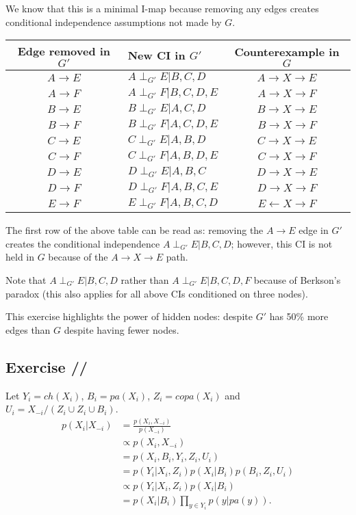 \documentclass[a4paper,11pt]{article}
\newcounter{exercise}
\newcounter{subexercise}
\newcommand*{\exercise}[1][]{\subsection*{Exercise \ifx/#1/\stepcounter{exercise}\arabic{exercise}\else#1\fi}\setcounter{subexercise}{0}}
\begin{document}
We know that this is a minimal I-map because removing any edges creates conditional
independence assumptions not made by $G$.
\begin{center}
    \begin{tabular}{ c|l|c } 
        Edge removed in $G'$ & New CI in $G'$ & Counterexample in $G$\\
         \hline
         $A\rightarrow E$ & $A\perp_{G'}E|B,C,D$ & $A\rightarrow X\rightarrow E$ \\
         $A\rightarrow F$ & $A\perp_{G'}F|B,C,D,E$ & $A\rightarrow X\rightarrow F$ \\
         $B\rightarrow E$ & $B\perp_{G'}E|A,C,D$ & $B\rightarrow X\rightarrow E$ \\
         $B\rightarrow F$ & $B\perp_{G'}F|A,C,D,E$ & $B\rightarrow X\rightarrow F$ \\
         $C\rightarrow E$ & $C\perp_{G'}E|A,B,D$ & $C\rightarrow X\rightarrow E$ \\
         $C\rightarrow F$ & $C\perp_{G'}F|A,B,D,E$ & $C\rightarrow X\rightarrow F$ \\
         $D\rightarrow E$ & $D\perp_{G'}E|A,B,C$ & $D\rightarrow X\rightarrow E$ \\
         $D\rightarrow F$ & $D\perp_{G'}F|A,B,C,E$ & $D\rightarrow X\rightarrow F$ \\
         $E\rightarrow F$ & $E\perp_{G'}F|A,B,C,D$ & $E\leftarrow X\rightarrow F$ \\
    \end{tabular}
\end{center}

The first row of the above table can be read as: removing the $A\rightarrow E$ edge in
$G'$ creates the conditional independence $A\perp_{G'}E|B,C,D$; however, this CI
is not held in $G$ because of the $A\rightarrow X\rightarrow E$ path.

Note that $A\perp_{G'}E|B,C,D$ rather than $A\perp_{G'}E|B,C,D,F$ because of
Berkson's paradox (this also applies for all above CIs conditioned on three nodes).

This exercise highlights the power of hidden nodes: despite $G'$ has 50\% more edges
than $G$ despite having fewer nodes.

\setcounter{exercise}{2}
\exercise
Let $Y_i=ch(X_i)$, $B_i=pa(X_i)$, $Z_i=copa(X_i)$ and $U_i=X_{-i}/(Z_i\cup Z_i\cup B_i)$.
\begin{align*}
    p(X_i|X_{-i}) &= \frac{p(X_i,X_{-i})}{p(X_{-i})} \\
    &\propto p(X_i,X_{-i}) \\
    &= p(X_i, B_i, Y_i, Z_i, U_i) \\
    &= p(Y_i|X_i, Z_i)p(X_i|B_i)p(B_i, Z_i, U_i) \\
    &\propto p(Y_i|X_i, Z_i)p(X_i|B_i) \\
    &= p(X_i|B_i)\prod\limits_{y\in Y_i}p(y|pa(y)).
\end{align*}
\end{document}

